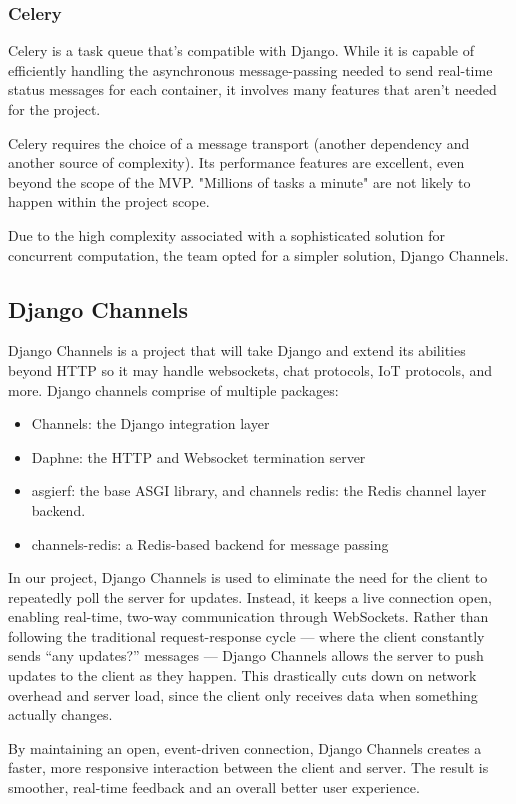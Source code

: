 \documentclass[12pt,titlepage]{article}
\begin{document}
\subsubsection{Celery}
Celery is a task queue that's compatible with Django. While it is capable of efficiently handling the asynchronous message-passing needed to send real-time status messages for each container, it involves many features that aren't needed for the project.

Celery requires the choice of a message transport (another dependency and another source of complexity). Its performance features are excellent, even beyond the scope of the MVP. "Millions of tasks a minute" \cite{celery} are not likely to happen within the project scope.

Due to the high complexity associated with a sophisticated solution for concurrent computation, the team opted for a simpler solution, Django Channels.

\subsection{Django Channels}
Django Channels is a project that will take Django and extend its abilities beyond HTTP so it may handle
websockets, chat protocols, IoT protocols, and more. 
Django channels comprise of multiple packages:
\begin{itemize}
    \item Channels: the Django integration layer
    \item Daphne: the HTTP and Websocket termination server
    \item asgierf: the base ASGI library, and channels redis: the Redis channel layer backend.
    \item channels-redis: a Redis-based backend for message passing
\end{itemize} 

In our project, Django Channels is used to eliminate the need for the client to repeatedly poll the server for updates.
Instead, it keeps a live connection open, enabling real-time, two-way communication through WebSockets.
Rather than following the traditional request-response cycle — where the client constantly sends “any updates?” messages —
Django Channels allows the server to push updates to the client as they happen.
This drastically cuts down on network overhead and server load, since the client only receives data when something actually changes.

By maintaining an open, event-driven connection, Django Channels creates a faster,
more responsive interaction between the client and server.
The result is smoother, real-time feedback and an overall better user experience.
\end{document}
